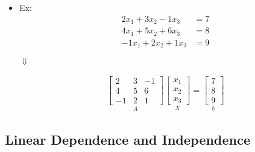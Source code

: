 \begin{itemize}
    \item Ex:
    \begin{align*}
            2x_1 + 3x_2 - 1x_3 & = 7 \\
            4x_1 + 5x_2 + 6x_3 & = 8 \\
            -1x_1 + 2x_2 + 1x_3 & = 9    
    \end{align*}
    \vspace{-3.5em}
    \begin{center}
        $\Downarrow$
    \end{center}
    \vspace{-2em}
    \begin{align*}
        \underset{A}{
            \begin{bmatrix}
                2 & 3 & -1 \\
                4 & 5 & 6 \\
                -1 & 2 & 1
            \end{bmatrix}
        }
        \underset{X}{
            \begin{bmatrix}
                x_1 \\
                x_2 \\
                x_3
            \end{bmatrix}
        }
        =
        \underset{b}{
            \begin{bmatrix}
                7 \\
                8 \\
                9
            \end{bmatrix}
        }
    \end{align*}
\end{itemize}


\subsection{Linear Dependence and Independence}

